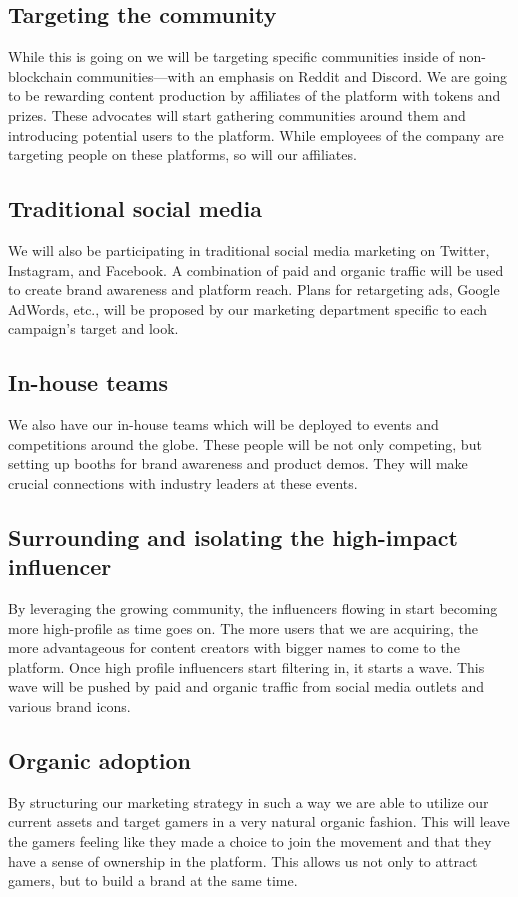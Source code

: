 \documentclass[11pt]{report}
\begin{document}
\subsection{Targeting the community}
While this is going on we will be targeting specific communities inside of non-blockchain communities---with an emphasis on Reddit and Discord. We are going to be rewarding content production by affiliates of the platform with tokens and prizes. These advocates will start gathering communities around them and introducing potential users to the platform. While employees of the company are targeting people on these platforms, so will our affiliates.
\subsection{Traditional social media}
We will also be participating in traditional social media marketing on Twitter, Instagram, and Facebook. A combination of paid and organic traffic will be used to create brand awareness and platform reach. Plans for retargeting ads, Google AdWords, etc., will be proposed by our marketing department specific to each campaign's target and look.
\subsection{In-house teams}
We also have our in-house teams which will be deployed to events and competitions around the globe. These people will be not only competing, but setting up booths for brand awareness and product demos. They will make crucial connections with industry leaders at these events.
\subsection{Surrounding and isolating the high-impact influencer}
By leveraging the growing community, the influencers flowing in start becoming more high-profile as time goes on. The more users that we are acquiring, the more advantageous for content creators with bigger names to come to the platform. Once high profile influencers start filtering in, it starts a wave. This wave will be pushed by paid and organic traffic from social media outlets and various brand icons.
\subsection{Organic adoption}
By structuring our marketing strategy in such a way we are able to utilize our current assets and target gamers in a very natural organic fashion. This will leave the gamers feeling like they made a choice to join the movement and that they have a sense of ownership in the platform. This allows us not only to attract gamers, but to build a brand at the same time.
\end{document}
